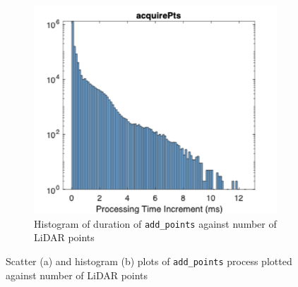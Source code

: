 \documentclass{erauthesis}
\begin{document}
\begin{figure}[htbp]
{\begin{subfigure}[t]{0.44\textwidth}
        \includegraphics[width=\textwidth]{Images/gbcache/Add_points_hist.png}
        \caption{Histogram of duration of \texttt{add\_points} against number of LiDAR points}
        \label{fig:gbcache_add_points_hist}
    \end{subfigure}
}
\caption{Scatter (a) and histogram (b) plots of \texttt{add\_points} process plotted against number of LiDAR points}
\label{fig:gbcache_add_points}
\end{figure}
\end{document}
